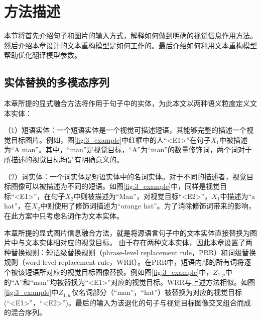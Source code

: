 \section{方法描述}

本节将首先介绍句子和图片的输入方式，解释如何做到明确的视觉信息作用方法。然后介绍本章设计的文本重构模型是如何工作的。最后介绍如何利用文本重构模型帮助优化翻译模型参数。

\subsection{实体替换的多模态序列}
\label{sec:3_entity_replacement}


本章所提的显式融合方法将作用于句子中的实体，为此本文以两种语义粒度定义文本实体：

（1）{\sffamily 短语实体：}一个短语实体是一个视觉可描述短语，其能够完整的描述一个视觉目标图片。例如，图\ref{fig:3_example}中红框中的人“<E1>”在句子$X_1$中被描述为“A man”。其中，“man”是视觉目标，“A”为“man”的数量修饰词，两个词对于所描述的视觉目标均是有明确意义的。

（2）{\sffamily 词实体：}一个词实体是短语实体中的名词实体。对于不同的描述者，视觉目标图像可以被描述为不同的短语。如图\ref{fig:3_example}中，同样是视觉目标“<E1>”，在句子$X_2$中则被描述为“Man”，对视觉目标“<E2>”，$X_1$中描述为“a hat”，在$X_2$中则使用了修饰词描述为“orange hat”。为了消除修饰词带来的影响，在此方案中只考虑名词作为文本实体。

本章所提的显式图片信息融合方法，就是将源语言句子中的文本实体直接替换为图片中与文本实体相对应的视觉目标。
由于存在两种文本实体，因此本章设置了两种替换规则：短语级替换规则（phrase-level replacement rule，PRR）和词级替换规则（word-level replacement rule，WRR）。在PRR中，短语内部的所有词将逐个被该短语所对应的视觉目标图像替换。例如图\ref{fig:3_example}中，$Z_{1,p}$中的“A”和“man”均被替换为“<E1>”对应的视觉目标。WRR与上述方法相似。如图\ref{fig:3_example}中$Z_{1,w}$仅名词部分（“man”，“hat”）被替换为对应的视觉目标(“<E1>”，“<E2>”)。最后的输入为该退化的句子与视觉目标图像交叉组合而成的混合序列。

